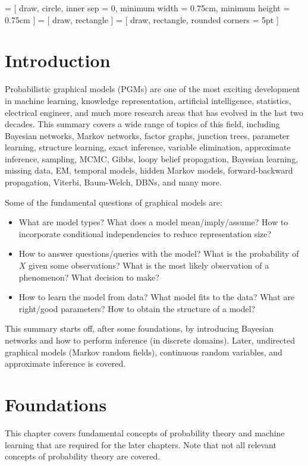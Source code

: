  = [
	draw,
	circle,
	inner sep = 0,
	minimum width = 0.75cm,
	minimum height = 0.75cm
]
 = [
	draw,
	rectangle
]
 = [
	draw,
	rectangle,
	rounded corners = 5pt
]

\chapter{Introduction}
	Probabilistic graphical models (PGMs) are one of the most exciting development in machine learning, knowledge representation, artificial intelligence, statistics, electrical engineer, and much more research areas that has evolved in the last two decades. This summary covers a wide range of topics of this field, including Bayesian networks, Markov networks, factor graphs, junction trees, parameter learning, structure learning, exact inference, variable elimination, approximate inference, sampling, MCMC, Gibbs, loopy belief propagation, Bayesian learning, missing data, EM, temporal models, hidden Markov models, forward-backward propagation, Viterbi, Baum-Welch, DBNs, and many more.

	Some of the fundamental questions of graphical models are:
	\begin{itemize}
		\item {} What are model types? What does a model mean/imply/assume? How to incorporate conditional independencies to reduce representation size?
		\item {}      How to answer questions/queries with the model? What is the probability of \(X\) given some observations? What is the most likely observation of a phenomenon? What decision to make?
		\item {}       How to learn the model from data? What model fits to the data? What are right/good parameters? How to obtain the structure of a model?
	\end{itemize}
	This summary starts off, after some foundations, by introducing Bayesian networks and how to perform inference (in discrete domains). Later, undirected graphical models (Markov random fields), continuous random variables, and approximate inference is covered.

\chapter{Foundations}
	This chapter covers fundamental concepts of probability theory and machine learning that are required for the later chapters. Note that not all relevant concepts of probability theory are covered.

